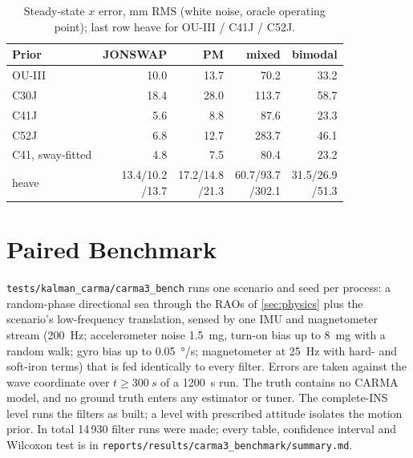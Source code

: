 \documentclass[conference]{IEEEtran}
\theoremstyle{bodysmall}
\begin{document}
\begin{table}[t]
\centering
\caption{Steady-state $x$ error, mm RMS (white noise, oracle operating
point); last row heave for OU-III / C41J / C52J.}
\label{tab:steady}
\footnotesize
\setlength{\tabcolsep}{3pt}
\begin{tabular}{@{}lrrrr@{}}
\toprule
Prior & JONSWAP & PM & mixed & bimodal\\
\midrule
OU-III & 10.0 & 13.7 & 70.2 & 33.2\\
C30J & 18.4 & 28.0 & 113.7 & 58.7\\
C41J & 5.6 & 8.8 & 87.6 & 23.3\\
C52J & 6.8 & 12.7 & 283.7 & 46.1\\
C41, sway-fitted & 4.8 & 7.5 & 80.4 & 23.2\\
\midrule
heave & \makecell{13.4/10.2\\/13.7} & \makecell{17.2/14.8\\/21.3} &
\makecell{60.7/93.7\\/302.1} & \makecell{31.5/26.9\\/51.3}\\
\bottomrule
\end{tabular}
\end{table}

\section{Paired Benchmark}
\label{sec:benchmark}
\texttt{tests/kalman\_carma/carma3\_bench} runs one scenario and seed per
process: a random-phase directional sea through the RAOs of
\cref{sec:physics} plus the scenario's low-frequency translation, sensed by
one IMU and magnetometer stream (\SI{200}{Hz}; accelerometer noise
\SI{1.5}{mg}, turn-on bias up to \SI{8}{mg} with a random walk; gyro bias
up to \SI{0.05}{\degree/s}; magnetometer at \SI{25}{Hz} with hard- and
soft-iron terms) that is fed identically to every filter. Errors are taken
against the wave coordinate over $t\ge\SI{300}{s}$ of a \SI{1200}{s} run.
The truth contains no CARMA model, and no ground truth enters any estimator
or tuner. The complete-INS level runs the filters as built; a level with
prescribed attitude isolates the motion prior. In total 14\,930 filter runs
were made; every table, confidence interval and Wilcoxon test is in
\texttt{reports/results/carma3\_benchmark/summary.md}.
\end{document}
